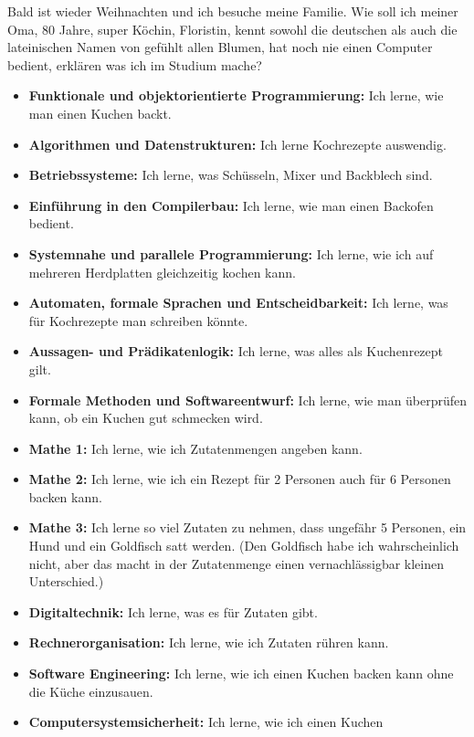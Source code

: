 {Bald ist wieder Weihnachten und ich besuche meine Familie. Wie soll ich
meiner Oma, 80 Jahre, super Köchin, Floristin, kennt sowohl die
deutschen als auch die lateinischen Namen von gefühlt allen Blumen, hat
noch nie einen Computer bedient, erklären was ich im Studium mache?
}
{

\begin{itemize}
	\item \textbf{Funktionale und objektorientierte Programmierung:} Ich
	lerne, wie man einen Kuchen backt.
	\item \textbf{Algorithmen und Datenstrukturen:} Ich lerne Kochrezepte
	auswendig.
	\item \textbf{Betriebssysteme:} Ich lerne, was Schüsseln, Mixer und
	Backblech sind.
	\item \textbf{Einführung in den Compilerbau:} Ich lerne, wie man einen
	Backofen bedient.
	\item \textbf{Systemnahe und parallele Programmierung:} Ich lerne, wie
	ich auf mehreren Herdplatten gleichzeitig kochen kann.
	\item \textbf{Automaten, formale Sprachen und Entscheidbarkeit:} Ich
	lerne, was für Kochrezepte man schreiben könnte.
	\item \textbf{Aussagen- und Prädikatenlogik:} Ich lerne, was alles als
	Kuchenrezept gilt.
	\item \textbf{Formale Methoden und Softwareentwurf:} Ich lerne, wie man
	überprüfen kann, ob ein Kuchen gut schmecken wird.
	\item \textbf{Mathe 1:} Ich lerne, wie ich Zutatenmengen angeben kann.
	\item \textbf{Mathe 2:} Ich lerne, wie ich ein Rezept für 2 Personen auch
	für 6 Personen backen kann.
	\item \textbf{Mathe 3:} Ich lerne so viel Zutaten zu nehmen, dass
	ungefähr 5 Personen, ein Hund und ein Goldfisch satt werden. (Den
	Goldfisch habe ich wahrscheinlich nicht, aber das macht in der
	Zutatenmenge einen vernachlässigbar kleinen Unterschied.)
	\item \textbf{Digitaltechnik:} Ich lerne, was es für Zutaten gibt.
	\item \textbf{Rechnerorganisation:} Ich lerne, wie ich Zutaten rühren kann.
	\item \textbf{Software Engineering:} Ich lerne, wie ich einen Kuchen backen kann ohne die Küche einzusauen.
	\item \textbf{Computersystemsicherheit:} Ich lerne, wie ich einen Kuchen

\end{itemize}}
